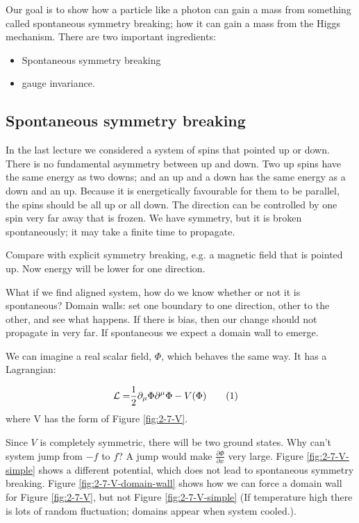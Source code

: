 \documentclass[]{article}
\newcommand\numberthis{\addtocounter{equation}{1}\tag{\theequation}}
\begin{document}
Our goal is to show how a particle like a photon can gain a mass from something called spontaneous symmetry breaking; how it can gain a mass from the Higgs mechanism. There are two important ingredients:

\begin{itemize}
	\item Spontaneous symmetry breaking
	\item gauge invariance.
\end{itemize}

\subsection{Spontaneous symmetry breaking}
In the last lecture we considered a system of spins that pointed up or down.
There is no fundamental asymmetry between up and down. Two up spins have the same energy as two downs; and an up and a down has the same energy as a down and an up. Because it is energetically favourable for them to be parallel, the spins should be all up or all down. The direction can be controlled by one spin very far away that is frozen. We have symmetry, but it is broken spontaneously; it may take a finite time to propagate.

Compare with explicit symmetry breaking, e.g. a magnetic field that is pointed up. Now energy will be lower for one direction.

What if we find aligned system, how do we know whether or not it is spontaneous? Domain walls: set one boundary to one direction, other to the other, and see what happens. If there is bias, then our change should not propagate in very far. If spontaneous we expect a domain wall to emerge.

We can imagine a real scalar field, $\Phi$, which behaves the same way. It has a Lagrangian:

\begin{align*}
	\mathcal{L} =& \frac{1}{2} \partial_\mu \Phi \partial^\mu \Phi - V(\Phi) \numberthis \label{eq:spontaneous:symmetry:L}
\end{align*}
where V has the form of Figure \ref{fig:2-7-V}.

Since $V$ is completely symmetric, there will be two ground states. Why can't system jump from $-f$ to $f$? A jump would make $\frac{\partial \Phi}{\partial x}$ very large. Figure \ref{fig:2-7-V-simple} shows a different potential, which does not lead to spontaneous symmetry breaking. Figure \ref{fig:2-7-V-domain-wall} shows how we can force a domain wall for Figure \ref{fig:2-7-V}, but not Figure \ref{fig:2-7-V-simple} (If temperature high there is lots of random fluctuation; domains appear when system cooled.).
\end{document}
